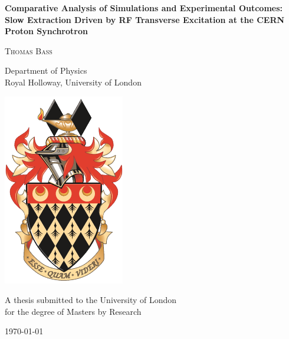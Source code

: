 \begin{titlepage}

\center

\vspace*{0.1cm}

\begin{spacing}{2}

{ \LARGE \bfseries Comparative Analysis of Simulations and Experimental Outcomes: Slow Extraction Driven by RF Transverse Excitation at the CERN Proton Synchrotron}\\[0.4cm] 


\vspace{1cm}

\textsc{\Large Thomas Bass}\\[0.5cm]

\end{spacing}
\begin{spacing}{1.5}
{\Large Department of Physics\\
Royal Holloway, University of London}\\[1.5cm]
\end{spacing}

\includegraphics[width=0.35\linewidth]{Royal_Holloway_coat_of_arms.png}\\[1cm] %
\begin{spacing}{1.5}
\begin{center}
    {\Large A thesis submitted to the University of London\\for the degree of Masters by Research}\\[1cm]
\end{center}


{\large \today}
\end{spacing}
\vfill 

\end{titlepage}

